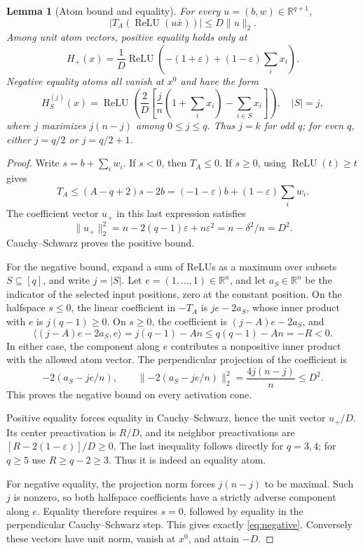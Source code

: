 \documentclass[11pt]{article}
\newtheorem{lemma}[theorem]{Lemma}
\newcommand{\R}{\mathbb R}
\newcommand{\relu}{\operatorname{ReLU}}
\newcommand{\norm}[1]{\lVert #1\rVert}
\begin{document}
\begin{lemma}[Atom bound and equality]\label{lem:atom}
For every $u=(b,w)\in\R^{q+1}$,
\begin{equation}\label{eq:atom}
 |T_A(\relu(u\bar x))|\le D\norm u_2.
\end{equation}
Among unit atom vectors, positive equality holds only at
\begin{equation}\label{eq:positive}
 H_+(x)=\frac1D\relu\!\left(-(1+\varepsilon)
                  +(1-\varepsilon)\sum_i x_i\right).
\end{equation}
Negative equality atoms all vanish at $x^0$ and have the form
\begin{equation}\label{eq:negative}
 H_S^{(j)}(x)=\relu\!\left(\frac2D
    \left[\frac jn\left(1+\sum_i x_i\right)
                    -\sum_{i\in S}x_i\right]\right),
 \quad |S|=j,
\end{equation}
where $j$ maximizes $j(n-j)$ among $0\le j\le q$.
Thus $j=k$ for odd $q$; for even $q$, either $j=q/2$ or $j=q/2+1$.
\end{lemma}
\begin{proof}
Write $s=b+\sum_iw_i$. If $s<0$, then $T_A\le0$. If $s\ge0$,
using $\relu(t)\ge t$ gives
\[
 T_A\le (A-q+2)s-2b
       =(-1-\varepsilon)b+(1-\varepsilon)\sum_iw_i.
\]
The coefficient vector $u_+$ in this last expression satisfies
\[
 \norm{u_+}_2^2
 =n-2(q-1)\varepsilon+n\varepsilon^2
 =n-\delta^2/n=D^2.
\]
Cauchy--Schwarz proves the positive bound.

For the negative bound, expand a sum of ReLUs as a maximum over
subsets $S\subseteq[q]$, and write $j=|S|$. Let
$e=(1,\ldots,1)\in\R^n$, and let $a_S\in\R^n$ be the indicator of
the selected input positions, zero at the constant position.
On the halfspace $s\le0$, the linear coefficient in $-T_A$ is
$je-2a_S$, whose inner product with $e$ is $j(q-1)\ge0$.
On $s\ge0$, the coefficient is $(j-A)e-2a_S$, and
\[
 \langle(j-A)e-2a_S,e\rangle
   =j(q-1)-An\le q(q-1)-An=-R<0.
\]
In either case, the component along $e$ contributes a nonpositive
inner product with the allowed atom vector. The perpendicular
projection of the coefficient is
\[
 -2(a_S-je/n),
 \qquad
 \norm{-2(a_S-je/n)}_2^2
     =\frac{4j(n-j)}n\le D^2.
\]
This proves the negative bound on every activation cone.

Positive equality forces equality in Cauchy--Schwarz, hence the
unit vector $u_+/D$. Its center preactivation is $R/D$, and its
neighbor preactivations are $[R-2(1-\varepsilon)]/D\ge0$.
The last inequality follows directly for $q=3,4$; for $q\ge5$ use
$R\ge q-2\ge3$. Thus it is indeed an equality atom.

For negative equality, the projection norm forces $j(n-j)$ to be
maximal. Such $j$ is nonzero, so both halfspace coefficients have
a strictly adverse component along $e$. Equality therefore requires
$s=0$, followed by equality in the perpendicular Cauchy--Schwarz
step. This gives exactly \eqref{eq:negative}. Conversely these
vectors have unit norm, vanish at $x^0$, and attain $-D$.
\end{proof}
\end{document}
